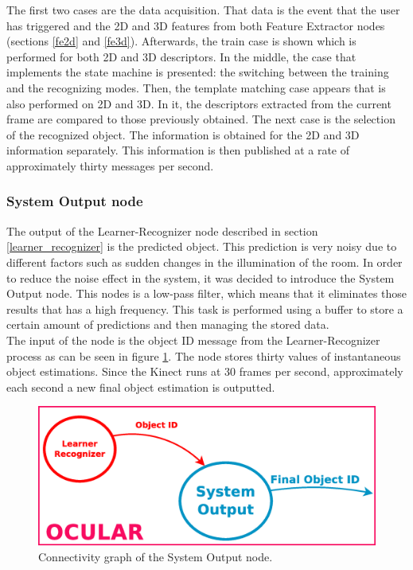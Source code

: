 	The first two cases are the data acquisition. 
	That data is the event that the user has triggered and the 2D and 3D features from both Feature Extractor nodes (sections \ref{fe2d} and \ref{fe3d}).
	Afterwards, the train case is shown which is performed for both 2D and 3D descriptors.
	In the middle, the case that implements the state machine is presented: the switching between the training and the recognizing modes. 
	Then, the template matching case appears that is also performed on 2D and 3D. 
	In it, the descriptors extracted from the current frame are compared to those previously obtained.
	The next case is the selection of the recognized object. 
	The information is obtained for the 2D and 3D information separately. 
	This information is then published at a rate of approximately thirty messages per second. 



\subsubsection{System Output node}
\label{last_node}
	The output of the Learner-Recognizer node described in section \ref{learner_recognizer} is the predicted object. 
	This prediction is very noisy due to different factors such as sudden changes in the illumination of the room. 
	In order to reduce the noise effect in the system, it was decided to introduce the System Output node. 
	This nodes is a low-pass filter, which means that it eliminates those results that has a high frequency. 
	This task is performed using a buffer to store a certain amount of predictions and then managing the stored data. 
	\\

	The input of the node is the object ID message from the Learner-Recognizer process as can be seen in figure \ref{node_output}.
	The node stores thirty values of instantaneous object estimations. 
	Since the Kinect runs at 30 frames per second, approximately each second a new final object estimation is outputted. 

	\begin{figure}[H]
			\begin{center}
			\includegraphics[width=0.5\linewidth]{img/diagrams/node_output.eps}
			\caption[System Output node I/O]{Connectivity graph of the System Output node.}		
			\label{node_output}
			\end{center}
		\end{figure}

